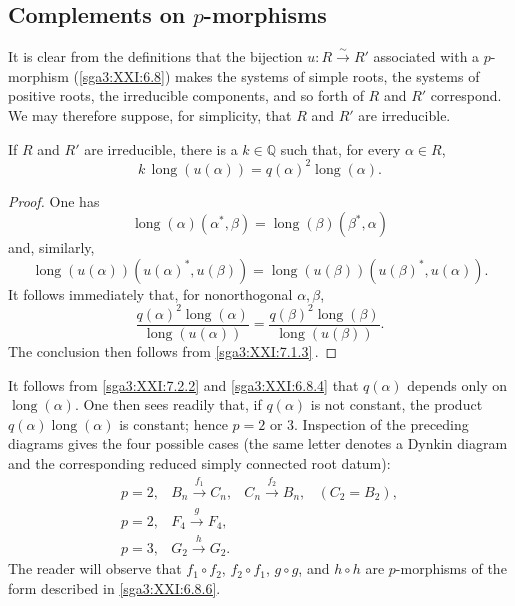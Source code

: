 \subsection{Complements on \(p\)-morphisms}\label{sga3:XXI:7.5}

It is clear from the definitions that the bijection
\(u:R\xrightarrow{\sim}R'\) associated with a \(p\)-morphism
(\ref{sga3:XXI:6.8}) makes the systems of simple roots, the systems of positive roots,
the irreducible components, and so forth of \(R\) and \(R'\)
correspond.  We may therefore suppose, for simplicity, that
\(R\) and \(R'\) are irreducible.

\begin{lemma}\label{sga3:XXI:7.5.1}
If \(R\) and \(R'\) are irreducible, there is a \(k\in\mathbb Q\)
such that, for every \(\alpha\in R\),
\[
 k\,\operatorname{long}(u(\alpha))
 =
 q(\alpha)^2\operatorname{long}(\alpha).
\]
\end{lemma}

\begin{proof}
One has
\[
 \operatorname{long}(\alpha)(\alpha^\ast,\beta)
 =
 \operatorname{long}(\beta)(\beta^\ast,\alpha)
\]
and, similarly,
\[
 \operatorname{long}(u(\alpha))
   (u(\alpha)^\ast,u(\beta))
 =
 \operatorname{long}(u(\beta))
   (u(\beta)^\ast,u(\alpha)).
\]
It follows immediately that, for nonorthogonal \(\alpha,\beta\),
\[
 \frac{q(\alpha)^2\operatorname{long}(\alpha)}
      {\operatorname{long}(u(\alpha))}
 =
 \frac{q(\beta)^2\operatorname{long}(\beta)}
      {\operatorname{long}(u(\beta))}.
\]
The conclusion then follows from \ref{sga3:XXI:7.1.3}\,.
\end{proof}

\begin{remark}\label{sga3:XXI:7.5.2}
It follows from \ref{sga3:XXI:7.2.2} and
\ref{sga3:XXI:6.8.4} that \(q(\alpha)\) depends only on
\(\operatorname{long}(\alpha)\).  One then sees readily that, if
\(q(\alpha)\) is not constant, the product
\(q(\alpha)\operatorname{long}(\alpha)\) is constant; hence
\(p=2\) or \(3\).  Inspection of the preceding diagrams gives the
four possible cases (the same letter denotes a Dynkin diagram and
the corresponding reduced simply connected root datum):
\[
\begin{array}{llll}
p=2, & B_n\xrightarrow{\,f_1\,}C_n,
     & C_n\xrightarrow{\,f_2\,}B_n,
     & (C_2=B_2),\\
p=2, & F_4\xrightarrow{\,g\,}F_4,\\
p=3, & G_2\xrightarrow{\,h\,}G_2.
\end{array}
\]
The reader will observe that
\(f_1\circ f_2\), \(f_2\circ f_1\), \(g\circ g\), and
\(h\circ h\) are \(p\)-morphisms of the form described in
\ref{sga3:XXI:6.8.6}.
\end{remark}

